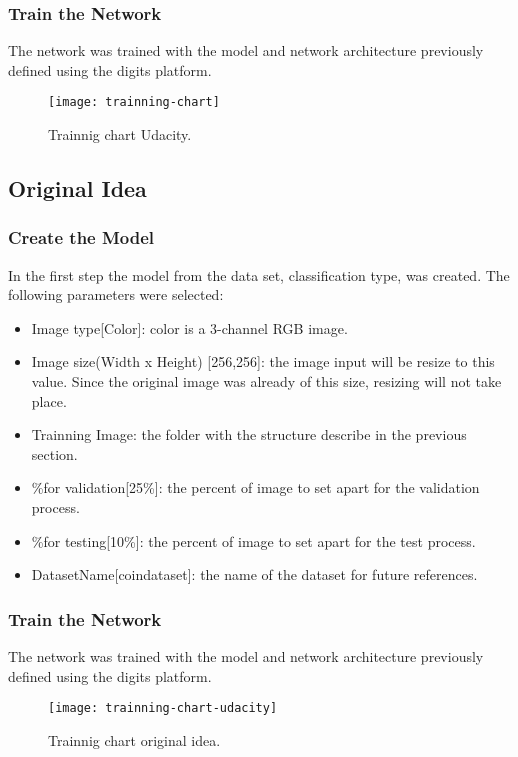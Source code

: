 \documentclass[10pt,journal,compsoc]{IEEEtran}
\begin{document}
\subsubsection{Train the Network}

The network was trained with the model and network architecture previously defined using the digits platform.

\begin{figure}[h]
\centering
\texttt{[image: trainning-chart]}
\caption{Trainnig chart Udacity.}
\label{fig:figure3}
\end{figure}


\subsection{Original Idea}
\subsubsection{Create the Model}

In the first step the model from the data set, classification type, was created. The following parameters were selected:

\begin{itemize}
\item Image type[Color]: color is a  3-channel RGB image.
\item Image size(Width x Height) [256,256]: the image input will be resize to this value. Since the original image was already of this size, resizing will not take place.
\item Trainning Image: the folder with the structure describe in the previous section. 
\item \%for validation[25\%]: the percent of image to set apart for the validation process.
\item \%for testing[10\%]: the percent of image to set apart for the test process.
\item DatasetName[coin\-dataset]: the name of the dataset for future references.
\end{itemize}

\subsubsection{Train the Network}

The network was trained with the model and network architecture previously defined using the digits platform.

\begin{figure}[h]
\centering
\texttt{[image: trainning-chart-udacity]}
\caption{Trainnig chart original idea.}
\label{fig:figure3}
\end{figure}
\end{document}
